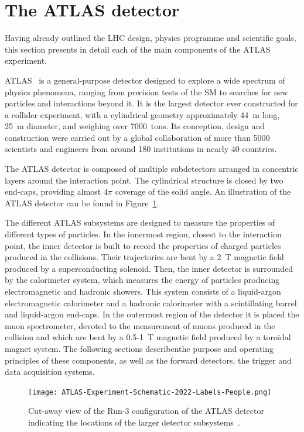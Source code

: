 \section{The ATLAS detector}
\label{sec:ATLAS}

Having already outlined the LHC design, physics programme and scientific goals, this section presents in detail each of the main components of the ATLAS experiment.

ATLAS~\cite{ATLAS:exp,ATLAS_run3} is a general-purpose detector designed to explore a wide spectrum of physics phenomena, ranging from precision tests of the SM to searches for new particles and interactions beyond it. It is the largest 
detector ever constructed for a collider experiment, with a cylindrical geometry approximately 44~m long, 25~m diameter, and weighing over 7000~tons. Its conception, design and construction were carried out by a global collaboration of more than 5000 scientists and engineers from around 180 institutions in nearly 40 countries.

The ATLAS detector is composed of multiple subdetectors arranged in concentric layers 
around the interaction point. The cylindrical structure is closed by two end-caps, providing almost $4\pi$ coverage of the solid angle. An illustration of the ATLAS detector can be found in Figure~\ref{fig:ATLASdet}.

The different ATLAS subsystems are designed to measure the properties of different types of particles. In the innermost region, closest to the interaction point, the inner detector is built to record the properties of charged particles produced in the collisions. Their trajectories 
are bent by a 2~T magnetic field produced by a superconducting solenoid. Then, the inner detector is surrounded by the calorimeter system, which measures the energy of particles producing electromagnetic and hadronic showers. This system consists of a liquid-argon electromagnetic calorimeter and a hadronic calorimeter with a scintillating barrel and liquid-argon end-caps.
In the outermost region of the detector it is placed the muon spectrometer, devoted to the measurement of muons produced in the collision and which are bent by a 0.5-1~T magnetic field produced by a toroidal magnet system.
The following sections describenthe purpose and operating principles of these components, as well as the forward detectors, the trigger and data acquisition systems.

\begin{figure}[htbp]
    \centering
        \texttt{[image: ATLAS-Experiment-Schematic-2022-Labels-People.png]}
    \caption{Cut-away view of the Run-3 configuration of the ATLAS detector indicating the locations of the larger detector subsystems~\cite{Bianchi:2837191}.}
    \label{fig:ATLASdet}
\end{figure}

